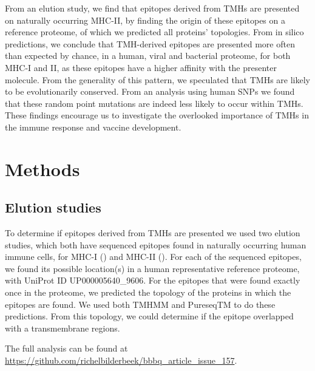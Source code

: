 From an elution study, we find that epitopes derived 
from TMHs are presented on naturally occurring MHC-II,
by finding the origin of these epitopes on a reference proteome,
of which we predicted all proteins' topologies.
From in silico predictions, we conclude that TMH-derived
epitopes are presented more often than expected by chance,
in a human, viral and bacterial proteome, for both MHC-I and II,
as these epitopes have a higher affinity with the presenter molecule.
From the generality of this pattern, we speculated that TMHs
are likely to be evolutionarily conserved. From an analysis using human
SNPs we found that these random point mutations are indeed less likely
to occur within TMHs. These findings encourage us to investigate the
overlooked importance of TMHs in the immune response and vaccine development.

\section{Methods}

\subsection{Elution studies}\label{subsec:elution_studies}

To determine if epitopes derived from TMHs are presented 
we used two elution studies, which both have sequenced
epitopes found in naturally occurring human immune cells,
for MHC-I (\cite{schellens2015comprehensive}) 
and MHC-II (\cite{bergseng2015different}).
For each of the sequenced epitopes,
we found its possible location(s) in 
a human representative reference proteome,
with UniProt ID UP000005640\_9606.
For the epitopes that were found exactly once in the proteome,
we predicted the topology of the proteins in which the epitopes are found.
We used both TMHMM and PureseqTM to do these predictions. 
From this topology, we could determine if the epitope
overlapped with a transmembrane regions.

The full analysis can be found
at \url{https://github.com/richelbilderbeek/bbbq_article_issue_157}.

